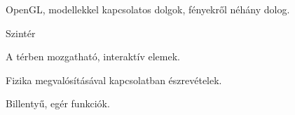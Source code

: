 



OpenGL, modellekkel kapcsolatos dolgok, fényekről néhány dolog.




Szintér

A térben mozgatható, interaktív elemek.


Fizika megvalósításával kapcsolatban észrevételek.


Billentyű, egér funkciók.

